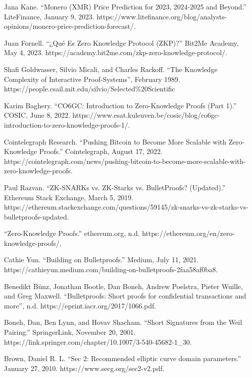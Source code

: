 \begin{thebibliography}{9}
Jana Kane. “Monero (XMR) Price Prediction for 2023, 2024-2025 and Beyond.” LiteFinance, January 9, 2023. https://www.litefinance.org/blog/analysts-opinions/monero-price-prediction-forecast/. 

Juan Fornell. “¿Qué Es Zero Knowledge Protocol (ZKP)?” Bit2Me Academy, May 4, 2023. https://academy.bit2me.com/zkp-zero-knowledge-protocol/.

Shafi Goldwasser, Silvio Micali, and Charles Rackoff. “The Knowledge Complexity of Interactive Proof-Systems”, February 1989. https://people.csail.mit.edu/silvio/Selected\%20Scientific%

Karim Baghery. “CO6GC: Introduction to Zero-Knowledge Proofs (Part 1).” COSIC, June 8, 2022. https://www.esat.kuleuven.be/cosic/blog/co6gc-introduction-to-zero-knowledge-proofs-1/. 

Cointelegraph Research. “Pushing Bitcoin to Become More Scalable with Zero-Knowledge Proofs.” Cointelegraph, August 17, 2022. https://cointelegraph.com/news/pushing-bitcoin-to-become-more-scalable-with-zero-knowledge-proofs. 

Paul Razvan. “ZK-SNARKs vs. ZK-Starks vs. BulletProofs? (Updated).” Ethereum Stack Exchange, March 5, 2019. https://ethereum.stackexchange.com/questions/59145/zk-snarks-vs-zk-starks-vs-bulletproofs-updated. 

“Zero-Knowledge Proofs.” ethereum.org, n.d. https://ethereum.org/en/zero-knowledge-proofs/. 

Cathie Yun. “Building on Bulletproofs.” Medium, July 11, 2021. https://cathieyun.medium.com/building-on-bulletproofs-2faa58af0ba8. 

Benedikt Bünz, Jonathan Bootle, Dan Boneh, Andrew Poelstra, Pieter Wuille, and Greg Maxwell. “Bulletproofs: Short proofs for confidential transactions and more”, n.d. https://eprint.iacr.org/2017/1066.pdf. 

Boneh, Dan, Ben Lynn, and Hovav Shacham. “Short Signatures from the Weil Pairing.” SpringerLink, November 20, 2001. https://link.springer.com/chapter/10.1007/3-540-45682-1\_30. 

Brown, Daniel R. L. “Sec 2: Recommended elliptic curve domain parameters.” January 27, 2010. https://www.secg.org/sec2-v2.pdf.


\end{thebibliography}

